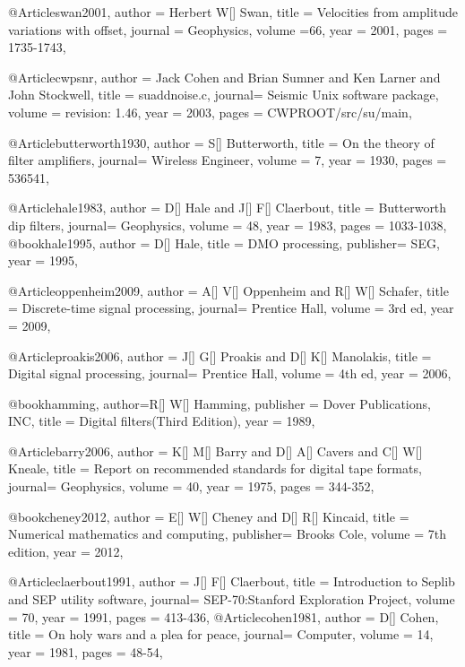 {@Article{swan2001,
  author = 	 {Herbert W[] Swan},
  title = 	 {Velocities from amplitude variations with offset},
  journal = 	 {Geophysics},
  volume ={66},
  year = 	 2001,
  pages =	 {1735-1743},
}

@Article{cwpsnr,
  author = 	 {Jack Cohen and Brian Sumner and Ken Larner and John Stockwell},
  title  = 	 {suaddnoise.c},
  journal= 	 {Seismic Unix software package},
  volume =	 {revision: 1.46},
  year   = 	 2003,
  pages  =	 {CWPROOT/src/su/main},
}

@Article{butterworth1930,
  author = 	 {S[] Butterworth},
  title  = 	 {On the theory of filter amplifiers},
  journal= 	 {Wireless Engineer},
  volume =	 {7},
  year   = 	 1930,
  pages  =	 {536541},
}

@Article{hale1983,
  author = 	 {D[] Hale and J[] F[] Claerbout},
  title  = 	 {Butterworth dip filters},
  journal= 	 {Geophysics},
  volume =	 {48},
  year   = 	 1983,
  pages  =	 {1033-1038},
}
@book{hale1995,
  author = 	 {D[] Hale},
  title  = 	 {DMO processing},
  publisher= 	 {SEG},
  year   = 	 1995,
}

@Article{oppenheim2009,
  author = 	 {A[] V[] Oppenheim and R[] W[] Schafer},
  title  = 	 {Discrete-time signal processing},
  journal= 	 {Prentice Hall},
  volume =	 {3rd ed},
  year   = 	 2009,
}

@Article{proakis2006,
  author = 	 {J[] G[] Proakis and D[] K[] Manolakis},
  title  = 	 {Digital signal processing},
  journal= 	 {Prentice Hall},
  volume =	 {4th ed},
  year   = 	 2006,
}

@book{hamming,
  author={R[] W[] Hamming},
  publisher = {Dover Publications, INC},
  title = {Digital filters(Third Edition)},
  year = {1989},
}

@Article{barry2006,
  author = 	 {K[] M[] Barry and D[] A[] Cavers and C[] W[] Kneale},
  title  = 	 {Report on recommended standards for digital tape formats},
  journal= 	 {Geophysics},
  volume =	 {40},
  year   = 	 1975,
  pages  = 	 344-352,
}

@book{cheney2012,
  author = 	 {E[] W[] Cheney and D[] R[] Kincaid},
  title  = 	 {Numerical mathematics and computing},
  publisher= 	 {Brooks Cole},
  volume =	 {7th edition},
  year   = 	 2012,
}

@Article{claerbout1991,
  author = 	 {J[] F[] Claerbout},
  title  = 	 {Introduction to Seplib and SEP utility software},
  journal= 	 {SEP-70:Stanford Exploration Project},
  volume =	 {70},
  year   = 	 1991,
  pages  =	 413-436,
}
@Article{cohen1981,
  author = 	 {D[] Cohen},
  title  = 	 {On holy wars and a plea for peace},
  journal= 	 {Computer},
  volume =	 {14},
  year   = 	 1981,
  pages  =   	 48-54,
}

}
